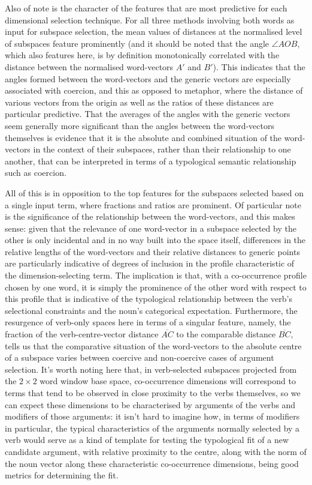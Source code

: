 Also of note is the character of the features that are most predictive for each dimensional selection technique.  For all three methods involving both words as input for subspace selection, the mean values of distances at the normalised level of subspaces feature prominently (and it should be noted that the angle $\angle AOB$, which also features here, is by definition monotonically correlated with the distance between the normalised word-vectors $A'$ and $B'$).  This indicates that the angles formed between the word-vectors and the generic vectors are especially associated with coercion, and this as opposed to metaphor, where the distance of various vectors from the origin as well as the ratios of these distances are particular predictive.  That the averages of the angles with the generic vectors seem generally more significant than the angles between the word-vectors themselves is evidence that it is the absolute and combined situation of the word-vectors in the context of their subspaces, rather than their relationship to one another, that can be interpreted in terms of a typological semantic relationship such as coercion.

All of this is in opposition to the top features for the subspaces selected based on a single input term, where fractions and ratios are prominent.  Of particular note is the significance of the relationship between the word-vectors, and this makes sense: given that the relevance of one word-vector in a subspace selected by the other is only incidental and in no way built into the space itself, differences in the relative lengths of the word-vectors and their relative distances to generic points are particularly indicative of degrees of inclusion in the profile characteristic of the dimension-selecting term.  The implication is that, with a co-occurrence profile chosen by one word, it is simply the prominence of the other word with respect to this profile that is indicative of the typological relationship between the verb's selectional constraints and the noun's categorical expectation.  Furthermore, the resurgence of verb-only spaces here in terms of a singular feature, namely, the fraction of the verb-centre-vector distance $\overline{AC}$ to the comparable distance $\overline{BC}$, tells us that the comparative situation of the word-vectors to the absolute centre of a subspace varies between coercive and non-coercive cases of argument selection.  It's worth noting here that, in verb-selected subspaces projected from the $2 \times 2$ word window base space, co-occurrence dimensions will correspond to terms that tend to be observed in close proximity to the verbs themselves, so we can expect these dimensions to be characterised by arguments of the verbs and modifiers of those arguments: it isn't hard to imagine how, in terms of modifiers in particular, the typical characteristics of the arguments normally selected by a verb would serve as a kind of template for testing the typological fit of a new candidate argument, with relative proximity to the centre, along with the norm of the noun vector along these characteristic co-occurrence dimensions, being good metrics for determining the fit.

